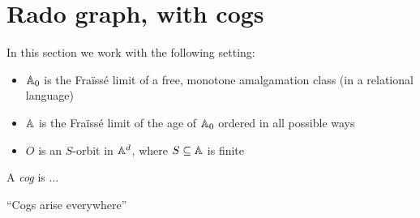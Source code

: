 \section{Rado graph, with cogs}
In this section we work with the following setting:
\begin{itemize}
    \item $\mathbb{A}_0$ is the Fraïssé limit of a free, monotone amalgamation class (in a relational language)
    \item $\mathbb{A}$ is the Fraïssé limit of the age of $\mathbb{A}_0$ ordered in all possible ways
    \item $O$ is an $S$-orbit in $\mathbb{A}^d$, where $S \subseteq \mathbb{A}$ is finite
\end{itemize}

\begin{definition}
    A \emph{cog} is ...
\end{definition}

\begin{proposition}
    ``Cogs arise everywhere''
\end{proposition}

